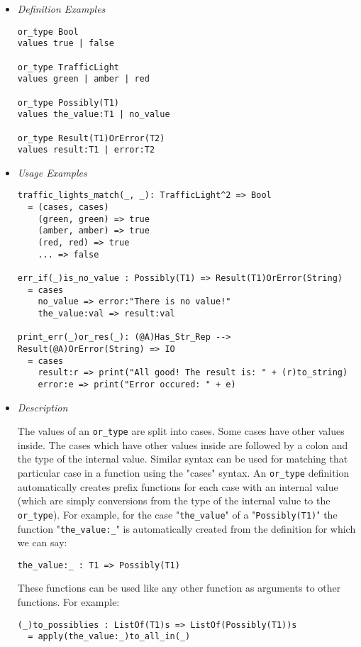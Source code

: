 \documentclass[diploma]{softlab-thesis}
\begin{document}
\begin{itemize}
\item \textit{Definition Examples}

\begin{verbatim}
or_type Bool
values true | false

or_type TrafficLight
values green | amber | red

or_type Possibly(T1)
values the_value:T1 | no_value

or_type Result(T1)OrError(T2)
values result:T1 | error:T2
\end{verbatim}

\item \textit{Usage Examples}

\begin{verbatim}
traffic_lights_match(_, _): TrafficLight^2 => Bool
  = (cases, cases)
    (green, green) => true
    (amber, amber) => true
    (red, red) => true
    ... => false

err_if(_)is_no_value : Possibly(T1) => Result(T1)OrError(String)
  = cases
    no_value => error:"There is no value!"
    the_value:val => result:val

print_err(_)or_res(_): (@A)Has_Str_Rep --> Result(@A)OrError(String) => IO
  = cases
    result:r => print("All good! The result is: " + (r)to_string)
    error:e => print("Error occured: " + e)
\end{verbatim}

\newpage
\item \textit{Description}

The values of an \verb|or_type| are split into cases. Some cases have other
values inside.  The cases which have other values inside are followed by a
colon and the type of the internal value. Similar syntax can be used for
matching that particular case in a function using the "cases" syntax.  An
\verb|or_type| definition automatically creates prefix functions for each case
with an internal value (which are simply conversions from the type of the
internal value to the \verb|or_type|).  For example, for the case
"\verb|the_value|" of a "\verb|Possibly(T1)|" the function "\verb|the_value:_|"
is automatically created from the definition for which we can say:
\begin{verbatim}
the_value:_ : T1 => Possibly(T1)
\end{verbatim}
These functions can be used like any other function as arguments to other
functions.  For example:
\begin{verbatim}
(_)to_possiblies : ListOf(T1)s => ListOf(Possibly(T1))s
  = apply(the_value:_)to_all_in(_)
\end{verbatim}


\end{itemize}
\end{document}
